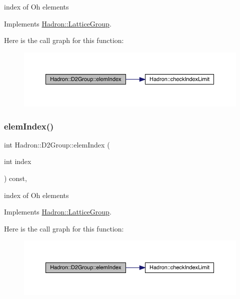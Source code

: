 index of Oh elements 

Implements \mbox{\hyperlink{structHadron_1_1LatticeGroup_afb8e3ee60de059f75bce1044c694e1e8}{Hadron\+::\+Lattice\+Group}}.

Here is the call graph for this function\+:
\nopagebreak
\begin{figure}[H]
\begin{center}
\leavevmode
\includegraphics[width=350pt]{d8/de7/structHadron_1_1D2Group_aa7676a51e002eb654648c4d84585d6da_cgraph}
\end{center}
\end{figure}
\mbox{\label{structHadron_1_1D2Group_aa7676a51e002eb654648c4d84585d6da}} 
\subsubsection{\texorpdfstring{elemIndex()}{elemIndex()}\hspace{0.1cm}{\footnotesize\ttfamily [3/3]}}
{\footnotesize\ttfamily int Hadron\+::\+D2\+Group\+::elem\+Index (\begin{DoxyParamCaption}\item[{int}]{index }\end{DoxyParamCaption}) const\hspace{0.3cm}{\ttfamily [inline]}, {\ttfamily [virtual]}}

index of Oh elements 

Implements \mbox{\hyperlink{structHadron_1_1LatticeGroup_afb8e3ee60de059f75bce1044c694e1e8}{Hadron\+::\+Lattice\+Group}}.

Here is the call graph for this function\+:
\nopagebreak
\begin{figure}[H]
\begin{center}
\leavevmode
\includegraphics[width=350pt]{d8/de7/structHadron_1_1D2Group_aa7676a51e002eb654648c4d84585d6da_cgraph}
\end{center}
\end{figure}
\mbox{\label{structHadron_1_1D2Group_aa6d99edf22f99550602f38437aadd890}} 
